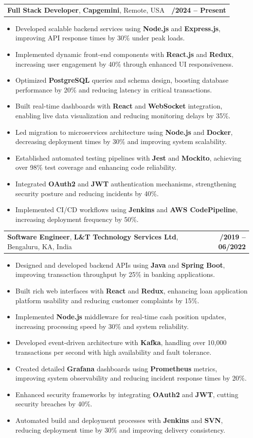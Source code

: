 \documentclass[letterpaper,11pt]{article}
\makeatletter
\newcommand{\resumeItem}[1]{
  \item\footnotesize{
    {#1 \vspace{-2pt}}
  }
}
\newcommand{\resumeSubheading}[4]{
  \vspace{-2pt}\item
    \begin{tabular*}{1.0\textwidth}[t]{l@{\extracolsep{\fill}}r}
      \textbf{\fontsize{10pt}{14pt}\selectfont #3}, \textbf{\fontsize{10pt}{14pt}\selectfont #1}, \fontsize{10pt}{14pt}\selectfont #4 & \textbf{\fontsize{10pt}{14pt}\selectfont #2} \\
    \end{tabular*}\vspace{-7pt}
}
\newcommand{\resumeItemListStart}{\begin{itemize}[leftmargin=*]}
\newcommand{\resumeItemListEnd}{\end{itemize}\vspace{-5pt}}
\makeatother
\begin{document}
    \resumeSubheading
        {Capgemini}{01/2024 -- Present}
        {Full Stack Developer}{Remote, USA}
      \resumeItemListStart
        \resumeItem{Developed scalable backend services using \textbf{Node.js} and \textbf{Express.js}, improving API response times by 30\% under peak loads.}
        \resumeItem{Implemented dynamic front-end components with \textbf{React.js} and \textbf{Redux}, increasing user engagement by 40\% through enhanced UI responsiveness.}
        \resumeItem{Optimized \textbf{PostgreSQL} queries and schema design, boosting database performance by 20\% and reducing latency in critical transactions.}
        \resumeItem{Built real-time dashboards with \textbf{React} and \textbf{WebSocket} integration, enabling live data visualization and reducing monitoring delays by 35\%.}
        \resumeItem{Led migration to microservices architecture using \textbf{Node.js} and \textbf{Docker}, decreasing deployment times by 30\% and improving system scalability.}
        \resumeItem{Established automated testing pipelines with \textbf{Jest} and \textbf{Mockito}, achieving over 98\% test coverage and enhancing code reliability.}
        \resumeItem{Integrated \textbf{OAuth2} and \textbf{JWT} authentication mechanisms, strengthening security posture and reducing incidents by 40\%.}
        \resumeItem{Implemented CI/CD workflows using \textbf{Jenkins} and \textbf{AWS CodePipeline}, increasing deployment frequency by 50\%.}
      \resumeItemListEnd

    \resumeSubheading
        {L\&T Technology Services Ltd}{08/2019 -- 06/2022}
        {Software Engineer}{Bengaluru, KA, India}
      \resumeItemListStart
        \resumeItem{Designed and developed backend APIs using \textbf{Java} and \textbf{Spring Boot}, improving transaction throughput by 25\% in banking applications.}
        \resumeItem{Built rich web interfaces with \textbf{React} and \textbf{Redux}, enhancing loan application platform usability and reducing customer complaints by 15\%.}
        \resumeItem{Implemented \textbf{Node.js} middleware for real-time cash position updates, increasing processing speed by 30\% and system reliability.}
        \resumeItem{Developed event-driven architecture with \textbf{Kafka}, handling over 10,000 transactions per second with high availability and fault tolerance.}
        \resumeItem{Created detailed \textbf{Grafana} dashboards using \textbf{Prometheus} metrics, improving system observability and reducing incident response times by 20\%.}
        \resumeItem{Enhanced security frameworks by integrating \textbf{OAuth2} and \textbf{JWT}, cutting security breaches by 40\%.}
        \resumeItem{Automated build and deployment processes with \textbf{Jenkins} and \textbf{SVN}, reducing deployment time by 30\% and improving delivery consistency.}
      \resumeItemListEnd
\end{document}
